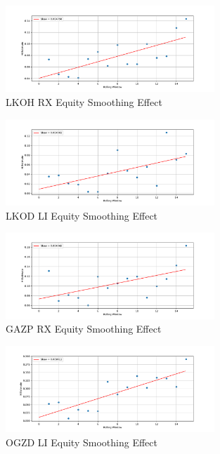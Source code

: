 \begin{figure}[h]
    \centering
    \includegraphics[width=0.7\textwidth]{fig/LKOH RX Equity Smoothing Effect.pdf}
    \caption{LKOH RX Equity Smoothing Effect}
\end{figure} 

\begin{figure}[h]
    \centering
    \includegraphics[width=0.7\textwidth]{fig/LKOD LI Equity Smoothing Effect.pdf}
    \caption{LKOD LI Equity Smoothing Effect}
\end{figure}

\begin{figure}[h]
    \centering
    \includegraphics[width=0.7\textwidth]{fig/GAZP RX Equity Smoothing Effect.pdf}
    \caption{GAZP RX Equity Smoothing Effect}
\end{figure} 

\begin{figure}[h]
    \centering
    \includegraphics[width=0.7\textwidth]{fig/OGZD LI Equity Smoothing Effect.pdf}
    \caption{OGZD LI Equity Smoothing Effect}
\end{figure} 

